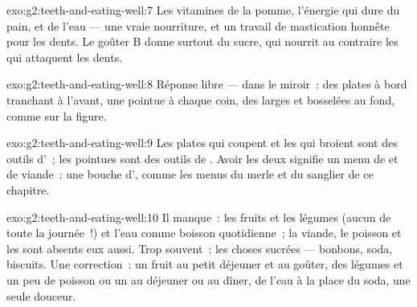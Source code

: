 \begin{solution}{exo:g2:teeth-and-eating-well:7}
Les vitamines de la pomme, l'énergie qui dure du pain, et de l'eau
--- une vraie nourriture, et un travail de mastication honnête pour
les dents. Le goûter B donne surtout du sucre, qui nourrit au
contraire les  qui attaquent les dents.
\end{solution}

\begin{solution}{exo:g2:teeth-and-eating-well:8}
Réponse libre --- dans le miroir~: des  plates à bord
tranchant à l'avant, une  pointue à chaque coin, des 
larges et bosselées au fond, comme sur la figure.
\end{solution}

\begin{solution}{exo:g2:teeth-and-eating-well:9}
Les  plates qui coupent et les  qui broient sont
des outils d'~; les  pointues sont des outils de
. Avoir les deux signifie un menu de  et de viande~:
une bouche d', comme les menus du merle et du sanglier de ce
chapitre.
\end{solution}

\begin{solution}{exo:g2:teeth-and-eating-well:10}
Il manque~: les fruits et les légumes (aucun de toute la journée~!)
et l'eau comme boisson quotidienne~; la viande, le poisson et les
 sont absents eux aussi. Trop souvent~: les choses sucrées ---
bonbons, soda, biscuits. Une correction~: un fruit au petit déjeuner
et au goûter, des légumes et un peu de poisson ou un  au déjeuner
ou au dîner, de l'eau à la place du soda, une seule douceur.
\end{solution}
